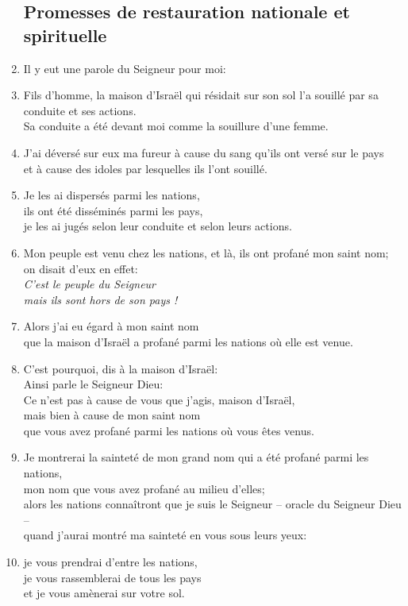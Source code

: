 \documentclass[12pt,a4paper,titlepage]{article}
\def \pslabelsep{0.2em} %
\def \psleftmargin{0em} %
\begin{document}
\begin{enumerate}[leftmargin=\psleftmargin, labelsep = \pslabelsep, label={\arabic*}, font=\color{\pscolor}\small\textsuperscript, parsep=0em, itemsep=0em, topsep=0em ]
\subsection*{Promesses de restauration nationale et spirituelle}
\item Il y eut une parole du Seigneur pour moi:
\item Fils d’homme, la maison d’Israël qui résidait sur son sol l’a souillé par sa conduite et ses actions. \\ Sa conduite a été devant moi comme la souillure d’une femme.
\item J’ai déversé sur eux ma fureur à cause du sang qu’ils ont versé sur le pays \\ et à cause des idoles par lesquelles ils l’ont souillé.
\item Je les ai dispersés parmi les nations, \\ ils ont été disséminés parmi les pays, \\ je les ai jugés selon leur conduite et selon leurs actions.
\item Mon peuple est venu chez les nations, et là, ils ont profané mon saint nom; \\ on disait d’eux en effet: \\ \decalage \og{}\emph{C’est le peuple du Seigneur \\ \decalage mais ils sont hors de son pays !}\fg{}
\item Alors j’ai eu égard à mon saint nom \\ que la maison d’Israël a profané parmi les nations où elle est venue. \parSpace
\item C’est pourquoi, dis à la maison d’Israël: \\ Ainsi parle le Seigneur Dieu: \\ Ce n’est pas à cause de vous que j’agis, maison d’Israël, \\ mais bien à cause de mon saint nom \\ que vous avez profané parmi les nations où vous êtes venus.
\item Je montrerai la sainteté de mon grand nom qui a été profané parmi les nations, \\ mon nom que vous avez profané au milieu d’elles; \\ alors les nations connaîtront que je suis le Seigneur – oracle du Seigneur Dieu – \\ quand j’aurai montré ma sainteté en vous sous leurs yeux:
\item je vous prendrai d’entre les nations, \\ je vous rassemblerai de tous les pays \\ et je vous amènerai sur votre sol.

\end{enumerate}
\end{document}
